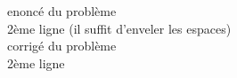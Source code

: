 {%
enoncé du problème\\
2ème ligne (il suffit d'enveler les espaces)
~\\
}
{%
corrigé du problème\\
2ème ligne
~\\
}
